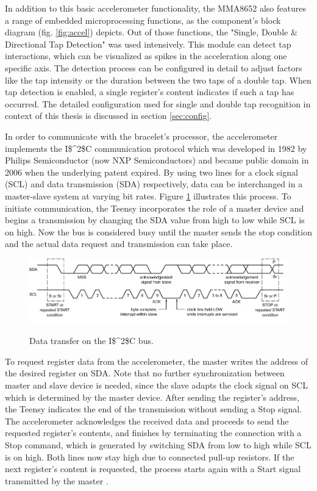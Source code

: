 In addition to this basic accelerometer functionality, the MMA8652 also features a range of embedded microprocessing functions, as the component's block diagram (fig. \ref{fig:accel}) depicts. Out of those functions, the "Single, Double \& Directional Tap Detection" was used intensively. This module can detect tap interactions, which can be visualized as spikes in the acceleration along one specific axis. The detection process can be configured in detail to adjust factors like the tap intensity or the duration between the two taps of a double tap. When tap detection is enabled, a single register's content indicates if such a tap has occurred. The detailed configuration used for single and double tap recognition in context of this thesis is discussed in section \ref{sec:config}.

In order to communicate with the bracelet's processor, the accelerometer implements the \ac{I$^2$C} communication protocol which was developed in 1982 by Philips Semiconductor (now NXP Semiconductors) and became public domain in 2006 when the underlying patent expired. By using two lines for a clock signal (\textsc{SCL}) and data transmission (\textsc{SDA}) respectively, data can be interchanged in a master-slave system at varying bit rates. Figure \ref{fig:i2c} illustrates this process. To initiate communication, the Teensy incorporates the role of a master device and begins a transmission by changing the \textsc{SDA} value from high to low while \textsc{SCL} is on high. Now the bus is considered busy until the master sends the stop condition and the actual data request and transmission can take place.

\begin{figure}[bth]
	\myfloatalign
	\includegraphics[width=\linewidth]{gfx/i2c.pdf}
	\label{fig:i2c}
	\caption{Data transfer on the \ac{I$^2$C} bus. \cite{i2c}}
\end{figure}

To request register data from the accelerometer, the master writes the address of the desired register on \textsc{SDA}. Note that no further synchronization between master and slave device is needed, since the slave adapts the clock signal on \textsc{SCL} which is determined by the master device. After sending the register's address, the Teensy indicates the end of the transmission without sending a Stop signal. The accelerometer acknowledges the received data and proceeds to send the requested register's contents, and finishes by terminating the connection with a Stop command, which is generated by switching \textsc{SDA} from low to high while \textsc{SCL} is on high. Both lines now stay high due to connected pull-up resistors. If the next register's content is requested, the process starts again with a Start signal transmitted by the master \cite{i2c}.

